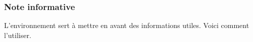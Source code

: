 \documentclass[12pt, a4paper]{article}
\begin{document}

\subsubsection{Note informative}

L'environnement  sert à mettre en avant des informations utiles. Voici comment l'utiliser.

\end{document}
